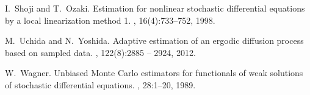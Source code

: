 \documentclass[12pt]{article}
\newcommand{\1}{\mathrm{1}}
\begin{document}
\begin{thebibliography}{10}
I.~Shoji and T.~Ozaki.
\newblock Estimation for nonlinear stochastic differential equations by a local
  linearization method 1.
, 16(4):733--752, 1998.

M.~Uchida and N.~Yoshida.
\newblock Adaptive estimation of an ergodic diffusion process based on sampled
  data.
, 122(8):2885 --
  2924, 2012.
  
W.~Wagner.
\newblock Unbiased {M}onte {C}arlo estimators for functionals of weak solutions of stochastic differential equations.
, 28:1--20, 1989.

\end{thebibliography}
\end{document}
